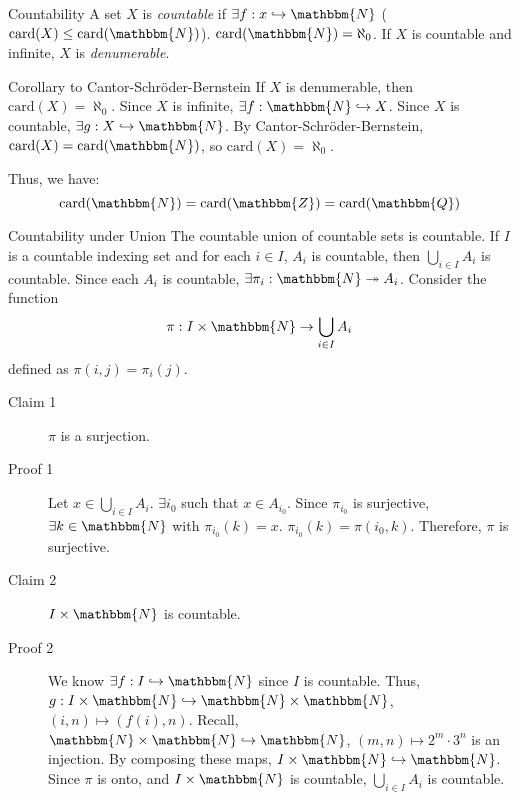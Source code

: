 \documentclass[10pt]{extarticle}
\newcommand{\card}{\text{card}}
\newcommand{\N}{\mathbbm{N}}
\newcommand{\Q}{\mathbbm{Q}}
\newcommand{\Z}{\mathbbm{Z}}
\begin{document}
  \begin{problem}{Countability}
    A set $X$ is \textsl{countable} if $\exists f: x\hookrightarrow \N$ ($\card(X) \leq\card(\N)$). $\card(\N) = \aleph_0$. If $X$ is countable and infinite, $X$ is \textit{denumerable}.
    \begin{problem}{Corollary to Cantor-Schröder-Bernstein}
      If $X$ is denumerable, then $\card(X) = \aleph_0$.
      \tcblower
      Since $X$ is infinite, $\exists f: \N\hookrightarrow X$. Since $X$ is countable, $\exists g: X\hookrightarrow \N$. By Cantor-Schröder-Bernstein, $\card(X) = \card(\N)$, so $\card(X) = \aleph_0$.
    \end{problem}
    Thus, we have: 
    \[
      \card(\N) = \card(\Z) = \card(\Q)
    \] 
    \begin{problem}{Countability under Union}
      The countable union of countable sets is countable. If $I$ is a countable indexing set and for each $i\in I$, $A_i$ is countable, then $\bigcup\limits_{i\in I} A_i$ is countable.
      \tcblower
      Since each $A_i$ is countable, $\exists \pi_i: \N \twoheadrightarrow A_i$. Consider the function
      \[
        \pi: I\times\N \rightarrow \bigcup_{i\in I}A_i
      \] 
      defined as $\pi(i,j) = \pi_i(j)$.
      \begin{description}
        \item[Claim 1] $\pi$ is a surjection.
        \item[Proof 1] Let $x\in \bigcup_{i\in I}A_i$. $\exists i_0$ such that $x\in A_{i_0}$. Since $\pi_{i_0}$ is surjective, $\exists k\in \N$ with $\pi_{i_0}(k) = x$. $\pi_{i_0}(k) = \pi(i_0,k)$. Therefore, $\pi$ is surjective.
        \item[Claim 2] $I\times\N$ is countable.
        \item[Proof 2] We know $\exists f: I\hookrightarrow\N$ since $I$ is countable. Thus, $g:I\times\N\hookrightarrow\N\times\N$, $(i,n)\mapsto (f(i),n)$. Recall, $\N\times\N\hookrightarrow \N$, $(m,n)\mapsto 2^m\cdot3^n$ is an injection. By composing these maps, $I\times\N\hookrightarrow\N$. Since $\pi$ is onto, and $I\times\N$ is countable, $\bigcup_{i\in I} A_i$ is countable.
      \end{description}
    \end{problem}
  \end{problem}
\end{document}
